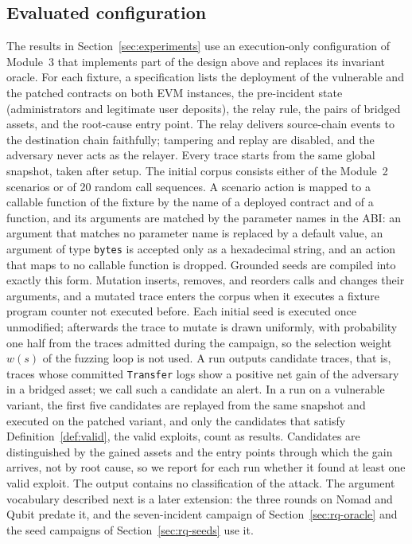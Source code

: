 \documentclass[a4paper]{cas-sc}
\begin{document}
\subsection{Evaluated configuration}\label{sec:evaluated}

The results in Section~\ref{sec:experiments} use an execution-only configuration of Module~3 that implements part of the design above and replaces its invariant oracle. For each fixture, a specification lists the deployment of the vulnerable and the patched contracts on both EVM instances, the pre-incident state (administrators and legitimate user deposits), the relay rule, the pairs of bridged assets, and the root-cause entry point. The relay delivers source-chain events to the destination chain faithfully; tampering and replay are disabled, and the adversary never acts as the relayer. Every trace starts from the same global snapshot, taken after setup. The initial corpus consists either of the Module~2 scenarios or of 20 random call sequences. A scenario action is mapped to a callable function of the fixture by the name of a deployed contract and of a function, and its arguments are matched by the parameter names in the ABI: an argument that matches no parameter name is replaced by a default value, an argument of type \texttt{bytes} is accepted only as a hexadecimal string, and an action that maps to no callable function is dropped. Grounded seeds are compiled into exactly this form. Mutation inserts, removes, and reorders calls and changes their arguments, and a mutated trace enters the corpus when it executes a fixture program counter not executed before. Each initial seed is executed once unmodified; afterwards the trace to mutate is drawn uniformly, with probability one half from the traces admitted during the campaign, so the selection weight $w(s)$ of the fuzzing loop is not used. A run outputs candidate traces, that is, traces whose committed \texttt{Transfer} logs show a positive net gain of the adversary in a bridged asset; we call such a candidate an alert. In a run on a vulnerable variant, the first five candidates are replayed from the same snapshot and executed on the patched variant, and only the candidates that satisfy Definition~\ref{def:valid}, the valid exploits, count as results. Candidates are distinguished by the gained assets and the entry points through which the gain arrives, not by root cause, so we report for each run whether it found at least one valid exploit. The output contains no classification of the attack. The argument vocabulary described next is a later extension: the three rounds on Nomad and Qubit predate it, and the seven-incident campaign of Section~\ref{sec:rq-oracle} and the seed campaigns of Section~\ref{sec:rq-seeds} use it.
\end{document}

